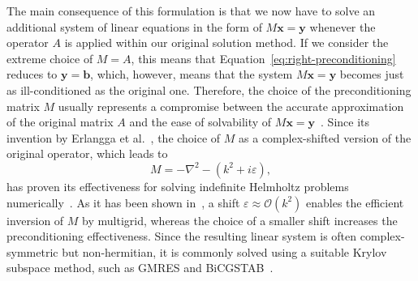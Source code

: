 The main consequence of this formulation is that we now have to solve an additional system of linear equations in the form of $M \bm{x} = \bm{y}$ whenever the operator $A$ is applied within our original solution method.
If we consider the extreme choice of $M = A$, this means that Equation~\eqref{eq:right-preconditioning} reduces to $\bm{y} = \bm{b}$, which, however, means that the system $M \bm{x} = \bm{y}$ becomes just as ill-conditioned as the original one.
Therefore, the choice of the preconditioning matrix $M$ usually represents a compromise between the accurate approximation of the original matrix $A$ and the ease of solvability of $M \bm{x} = \bm{y}$~\cite{benzi2002preconditioning}.
Since its invention by Erlangga et al.~\cite{erlangga2004preconditioner}, the choice of $M$ as a complex-shifted version of the original operator, which leads to
\begin{equation*}
	M = -\nabla ^{2} - (k^{2} + i \varepsilon),
\end{equation*}
has proven its effectiveness for solving indefinite Helmholtz problems numerically~\cite{erlangga2008advances,cocquet2017shift,umetami2009multigrid,cools2013analysis}.
As it has been shown in~\cite{cocquet2017shift}, a shift $\varepsilon \approx \mathcal{O}(k^2)$ enables the efficient inversion of $M$ by multigrid, whereas the choice of a smaller shift increases the preconditioning effectiveness.
Since the resulting linear system is often complex-symmetric but non-hermitian, it is commonly solved using a suitable Krylov subspace method, such as GMRES and BiCGSTAB~\cite{saad2003iterative}.
